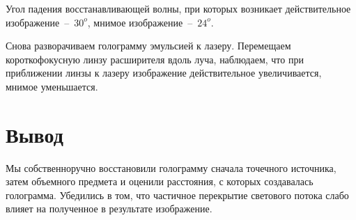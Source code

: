 \documentclass{letask}
\begin{document}
Угол падения восстанавливающей волны, при которых возникает действительное изображение~--~$30^o$, мнимое изображение~--~$24^o$.

Снова разворачиваем голограмму эмульсией к лазеру. Перемещаем короткофокусную линзу расширителя вдоль луча, наблюдаем, что при приближении линзы к лазеру изображение действительное увеличивается, мнимое уменьшается.

\section{Вывод}
Мы собственноручно восстановили голограмму сначала точечного источника, затем объемного предмета и оценили расстояния, с которых создавалась голограмма. Убедились в том, что частичное перекрытие светового потока слабо влияет на полученное в результате изображение.
\end{document}
